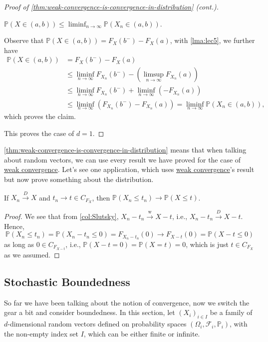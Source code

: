 \begin{proof}[Proof of \autoref{thm:weak-convergence-is-convergence-in-distribution} (cont.)]
	\begin{claim}
		\(\mathbb{P} (X \in (a, b)) \leq \liminf_{n \to \infty} \mathbb{P} (X_n \in (a, b))\).
	\end{claim}
	\begin{explanation}
		Observe that \(\mathbb{P} (X \in (a, b)) = F_X(b^-) - F_X(a)\), with \autoref{lma:lec5}, we further have
		\[
			\begin{split}
				\mathbb{P} (X \in (a, b))
				 & = F_X(b^-) - F_X(a)                                                                         \\
				 & \leq \liminf_{n \to \infty} F_{X_n}(b^-) - \left( \limsup_{n \to \infty} F_{X_n}(a) \right) \\
				 & \leq \liminf_{n \to \infty} F_{X_n}(b^-) + \liminf_{n \to \infty} (-F_{X_n}(a))             \\
				 & \leq \liminf_{n \to \infty} \left( F_{X_n}(b^-) - F_{X_n}(a) \right)
				= \liminf_{n \to \infty} \mathbb{P} (X_n \in (a, b)),
			\end{split}
		\]
		which proves the claim.
	\end{explanation}
	This proves the case of \(d = 1\).
\end{proof}

\autoref{thm:weak-convergence-is-convergence-in-distribution} means that when talking about random vectors, we can use every result we have proved for the case of \hyperref[def:converge-weakly]{weak convergence}. Let's see one application, which uses \hyperref[def:converge-weakly]{weak convergence}'s result but now prove something about the distribution.

\begin{proposition}
	If \(X_n \overset{D}{\to } X\) and \(t_n \to t \in C_{F_X}\), then \(\mathbb{P} (X_n \leq t_n) \to \mathbb{P} (X \leq t)\).
\end{proposition}
\begin{proof}
	We see that from \autoref{col:Slutsky}, \(X_n - t_n \overset{\text{w} }{\to } X - t\), i.e., \(X_n - t_n \overset{D}{\to } X - t\). Hence,
	\[
		\mathbb{P} (X_n \leq t_n)
		= \mathbb{P} (X_n - t_n \leq 0)
		= F_{X_n - t_n} (0)
		\to F_{X - t} (0)
		= \mathbb{P} (X - t \leq 0)
	\]
	as long as \(0 \in C_{F_{X - t}}\), i.e., \(\mathbb{P} (X - t = 0) = \mathbb{P} (X = t) = 0\), which is just \(t \in C_{F_X}\) as we assumed.
\end{proof}

\subsection{Stochastic Boundedness}
So far we have been talking about the notion of convergence, now we switch the gear a bit and consider boundedness. In this section, let \((X_i)_{i \in I}\) be a family of \(d\)-dimensional random vectors defined on probability spaces \((\Omega _i, \mathscr{F} _i, \mathbb{P} _i)\), with the non-empty index set \(I\), which can be either finite or infinite.

